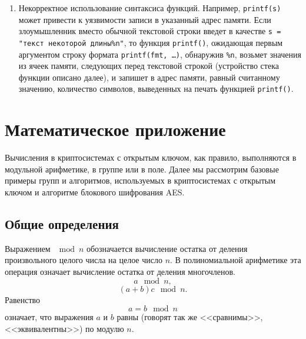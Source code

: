 \documentclass[10pt,a4paper]{book}
\begin{document}
\begin{enumerate}
\begin{enumerate}
        \end{enumerate}
    \item Некорректное использование синтаксиса функций. Например, \texttt{printf(s)} может привести к уязвимости записи в указанный адрес памяти. Если злоумышленник вместо обычной текстовой строки введет в качестве \texttt{s = "текст некоторой длины\%n"}, то функция \texttt{printf()}, ожидающая первым аргументом строку формата \texttt{printf(fmt, \dots)}, обнаружив \texttt{\%n}, возьмет значения из ячеек памяти, следующих перед текстовой строкой (устройство стека функции описано далее), и запишет в адрес памяти, равный считанному значению, количество символов, выведенных на печать функцией \texttt{printf()}.
\end{enumerate}










\appendix

\chapter{Математическое приложение}
\label{chap:discrete-math}

Вычисления в криптосистемах с открытым ключом, как правило, выполняются в модульной арифметике, в группе или в поле. Далее мы рассмотрим базовые примеры групп и алгоритмов, используемых в криптосистемах с открытым ключом и алгоритме блокового шифрования AES.

\section*{Общие определения}

Выражением $\mod n$ обозначается вычисление остатка от деления произвольного целого числа на целое число $n$. В полиномиальной арифметике эта операция означает вычисление остатка от деления многочленов.
    \[ a\mod n, \]
    \[ (a + b) c\mod n. \]
Равенство
    \[ a = b \mod n \]
означает, что выражения $a$ и $b$ равны (говорят так же <<сравнимы>>, <<эквивалентны>>) по модулю $n$.
\end{document}
